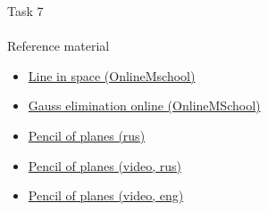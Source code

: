 \documentclass[aspectratio=169]{beamer}
\newcommand{\fbckg}[1]{\usebackgroundtemplate{\texttt{[image: \#1]}}}%
\begin{document}
\begin{frame}[t]{Task 7}
    \framesubtitle{}
\end{frame}

\begin{frame}[t]{Reference material}
    \Large
    \begin{itemize}
        \item \href{https://onlinemschool.com/math/library/analytic_geometry/line/}{Line in space (OnlineMschool)}
        \item \href{https://onlinemschool.com/math/assistance/equation/gaus/}{Gauss elimination online (OnlineMSchool)}
        \item \href{http://www.cleverstudents.ru/line_and_plane/pencil_of_planes.html}{Pencil of planes (rus)}
        \item \href{https://youtu.be/8uDOczIFVbU}{Pencil of planes (video, rus)}
        \item \href{https://www.youtube.com/watch?v=RujKAqwIz2Q}{Pencil of planes (video, eng)}
    \end{itemize}
\end{frame}

\fbckg{fibeamer/figs/last_page.png}
\frame[plain]{}
\end{document}

